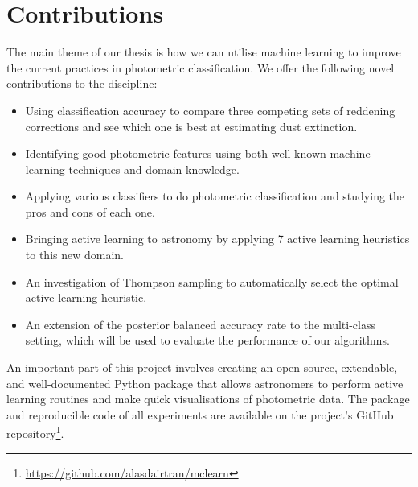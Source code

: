 \section{Contributions}
\label{sec:contributions}
The main theme of our thesis is how we can utilise machine learning to improve 
the current practices in photometric classification. We offer the
following novel contributions to the discipline:
	\begin{itemize}
		\item Using classification accuracy to compare three competing sets of reddening
		corrections and see which one is best at estimating dust extinction.
		\item Identifying good photometric features using both well-known machine learning techniques
		and domain knowledge.
		\item Applying various classifiers to do photometric classification and studying the
		pros and cons of each one.
		\item Bringing active learning to astronomy by applying 7 active learning heuristics
		to this new domain.
		\item An investigation of Thompson sampling to automatically select the optimal active
		learning heuristic.
		\item An extension of the
		posterior balanced accuracy rate to the multi-class setting, which will be used to evaluate
		the performance of our algorithms.
	\end{itemize}
An important part of this project involves creating an
open-source, extendable, and well-documented Python package that allows astronomers to perform active learning
routines and make quick visualisations of photometric data. The package and
reproducible code of all experiments are available on the project's GitHub repository\footnote{
	\url{https://github.com/alasdairtran/mclearn}}.


